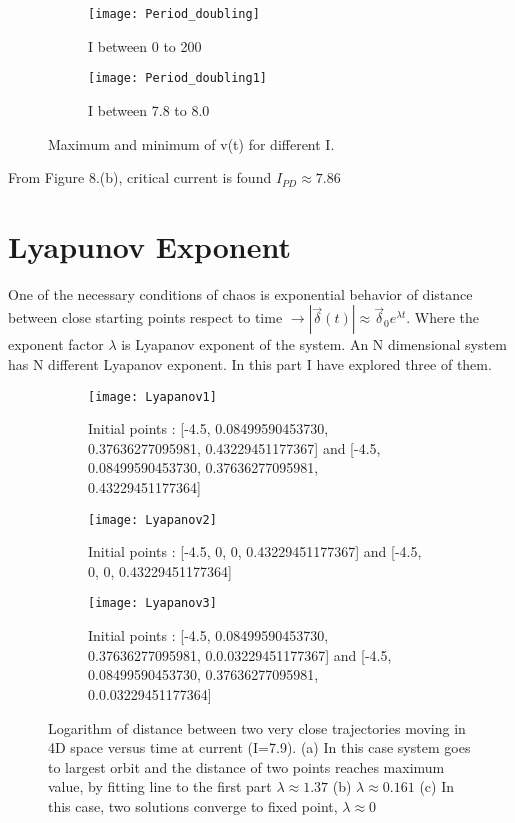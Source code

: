 \documentclass{article}
\begin{document}
		
		\begin{figure}[H]
			\centering
			\begin{subfigure}{0.7\textwidth}
				\centering
				\texttt{[image: Period\_doubling]}
				\caption{I between 0 to 200}  
				\label{fig:mean and std of net14}
			\end{subfigure}
			\hfill
			\begin{subfigure}{0.7\textwidth}  
				\centering 
				\texttt{[image: Period\_doubling1]}
				\caption{I between 7.8 to 8.0}   
				\label{fig:mean and std of net24}
			\end{subfigure}
			\caption{Maximum and minimum of v(t) for different I.} 
			\label{fig:mean and std nets}
		\end{figure}
		
		From Figure 8.(b), critical current is found $I_{PD} \approx 7.86$
		
	\section{Lyapunov Exponent}
		One of the necessary conditions of chaos is exponential behavior of distance between close starting points respect to time $\rightarrow |\vec{\delta}(t)| \approx \vec{\delta}_0 e^{\lambda t}$. Where the exponent factor $\lambda$ is Lyapanov exponent of the system. An N dimensional system has N different Lyapanov exponent. In this part I have explored three of them. \\
		
		\begin{figure}[H]
			\centering
			\begin{subfigure}{0.7\textwidth}
				\centering
				\texttt{[image: Lyapanov1]}
				\caption{Initial points : [-4.5, 0.08499590453730, 0.37636277095981, 0.43229451177367] and [-4.5, 0.08499590453730, 0.37636277095981, 0.43229451177364]}  
				\label{fig:mean and std of net14}
			\end{subfigure}
			\hfill
			\begin{subfigure}{0.7\textwidth}  
				\centering 
				\texttt{[image: Lyapanov2]}
				\caption{Initial points : [-4.5, 0, 0, 0.43229451177367] and [-4.5, 0, 0, 0.43229451177364]}   
				\label{fig:mean and std of net24}
			\end{subfigure}
			\hfill
			\begin{subfigure}{0.7\textwidth}  
				\centering 
				\texttt{[image: Lyapanov3]}
				\caption{Initial points : [-4.5, 0.08499590453730, 0.37636277095981, 0.0.03229451177367] and [-4.5, 0.08499590453730, 0.37636277095981, 0.0.03229451177364]}   
				\label{fig:mean and std of net24}
			\end{subfigure}
			\caption{Logarithm of distance between two very close trajectories moving in 4D space versus time at current (I=7.9). (a) In this case system goes to largest orbit and the distance of two points reaches maximum value, by fitting line to the first part $\lambda \approx 1.37$ (b) $\lambda \approx0.161$ (c) In this case, two solutions converge to fixed point, $\lambda \approx 0$} 
			\label{fig:mean and std nets}
		\end{figure}
\end{document}
